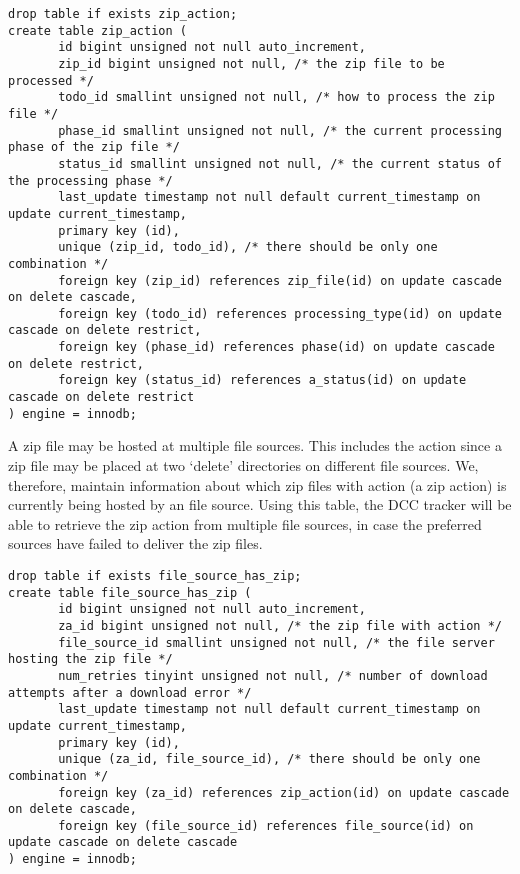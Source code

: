 \documentclass[a4paper,11pt]{article}
\begin{document}
\begin{landscape}
\begin{Verbatim}[fontsize=\small,formatcom=\color{blue}]
drop table if exists zip_action;
create table zip_action (
       id bigint unsigned not null auto_increment,
       zip_id bigint unsigned not null, /* the zip file to be processed */
       todo_id smallint unsigned not null, /* how to process the zip file */
       phase_id smallint unsigned not null, /* the current processing phase of the zip file */
       status_id smallint unsigned not null, /* the current status of the processing phase */
       last_update timestamp not null default current_timestamp on update current_timestamp,
       primary key (id),
       unique (zip_id, todo_id), /* there should be only one combination */
       foreign key (zip_id) references zip_file(id) on update cascade on delete cascade,
       foreign key (todo_id) references processing_type(id) on update cascade on delete restrict,
       foreign key (phase_id) references phase(id) on update cascade on delete restrict,
       foreign key (status_id) references a_status(id) on update cascade on delete restrict
) engine = innodb;
\end{Verbatim}

A zip file may be hosted at multiple file sources. This includes the action since a zip file may be placed at two `delete' directories on different file sources. We, therefore, maintain information about which zip files with action (a zip action) is currently being hosted by an file source. Using this table, the DCC tracker will be able to retrieve the zip action from multiple file sources, in case the preferred sources have failed to deliver the zip files.

\begin{Verbatim}[fontsize=\small,formatcom=\color{blue}]
drop table if exists file_source_has_zip;
create table file_source_has_zip (
       id bigint unsigned not null auto_increment,
       za_id bigint unsigned not null, /* the zip file with action */
       file_source_id smallint unsigned not null, /* the file server hosting the zip file */
       num_retries tinyint unsigned not null, /* number of download attempts after a download error */
       last_update timestamp not null default current_timestamp on update current_timestamp,
       primary key (id),
       unique (za_id, file_source_id), /* there should be only one combination */
       foreign key (za_id) references zip_action(id) on update cascade on delete cascade,
       foreign key (file_source_id) references file_source(id) on update cascade on delete cascade
) engine = innodb;
\end{Verbatim}


\end{landscape}
\end{document}

